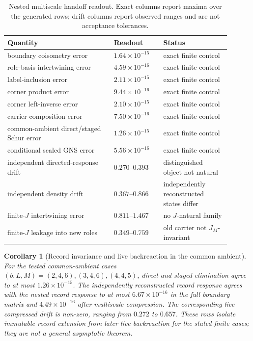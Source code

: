 \documentclass[11pt]{article}
\newtheorem{corollary}[definition]{Corollary}
\theoremstyle{remark}
\numberwithin{equation}{section}
\begin{document}
\begin{table}[htbp]
\centering
\caption{Nested multiscale handoff readout.  Exact columns report maxima over the generated rows; drift columns report observed ranges and are not acceptance tolerances.}\label{tab:nested-multiscale-handoff}
\begin{tabular}{>{\raggedright\arraybackslash}p{0.43\linewidth}>{\raggedleft\arraybackslash}p{0.20\linewidth}>{\raggedright\arraybackslash}p{0.27\linewidth}}
\toprule
\textbf{Quantity} & \textbf{Readout} & \textbf{Status}\\
\midrule
boundary coisometry error & $1.64\times10^{-15}$ & exact finite control\\
role-basis intertwining error & $4.59\times10^{-16}$ & exact finite control\\
label-inclusion error & $2.11\times10^{-15}$ & exact finite control\\
corner product error & $9.44\times10^{-16}$ & exact finite control\\
corner left-inverse error & $2.10\times10^{-15}$ & exact finite control\\
carrier composition error & $7.50\times10^{-16}$ & exact finite control\\
common-ambient direct/staged Schur error & $1.26\times10^{-15}$ & exact finite control\\
conditional scaled GNS error & $5.56\times10^{-16}$ & exact finite control\\
independent directed-response drift & $0.270$--$0.393$ & distinguished object not natural\\
independent density drift & $0.367$--$0.866$ & independently reconstructed states differ\\
finite-$J$ intertwining error & $0.811$--$1.467$ & no $J$-natural family\\
finite-$J$ leakage into new roles & $0.349$--$0.759$ & old carrier not $J_M$-invariant\\
\bottomrule
\end{tabular}
\end{table}

\begin{corollary}[Record invariance and live backreaction in the common ambient]\label{cor:record-live-common-ambient}
For the tested common-ambient cases \((b,L,M)=(2,4,6),(3,4,6),(4,4,5)\), direct and staged elimination agree to at most \(1.26\times10^{-15}\).  The independently reconstructed record response agrees with the nested record response to at most \(6.67\times10^{-16}\) in the full boundary matrix and \(4.49\times10^{-16}\) after multiscale compression.  The corresponding live compressed drift is non-zero, ranging from \(0.272\) to \(0.657\).  These rows isolate immutable record extension from later live backreaction for the stated finite cases; they are not a general asymptotic theorem.
\end{corollary}
\end{document}
